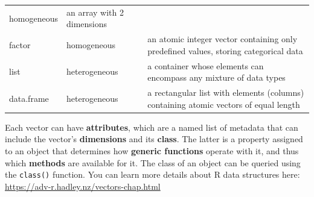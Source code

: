 \documentclass[
]{book}
\begin{document}
\begin{longtable}[]{@{}lll@{}}
\begin{minipage}[t]{0.10\columnwidth}
homogeneous\strut
\end{minipage} & \begin{minipage}[t]{0.71\columnwidth}\raggedright
an array with 2 dimensions\strut
\end{minipage}\tabularnewline
\begin{minipage}[t]{0.10\columnwidth}\raggedright
factor\strut
\end{minipage} & \begin{minipage}[t]{0.10\columnwidth}\raggedright
homogeneous\strut
\end{minipage} & \begin{minipage}[t]{0.71\columnwidth}\raggedright
an atomic integer vector containing only predefined values, storing categorical data\strut
\end{minipage}\tabularnewline
\begin{minipage}[t]{0.10\columnwidth}\raggedright
list\strut
\end{minipage} & \begin{minipage}[t]{0.10\columnwidth}\raggedright
heterogeneous\strut
\end{minipage} & \begin{minipage}[t]{0.71\columnwidth}\raggedright
a container whose elements can encompass any mixture of data types\strut
\end{minipage}\tabularnewline
\begin{minipage}[t]{0.10\columnwidth}\raggedright
data.frame\strut
\end{minipage} & \begin{minipage}[t]{0.10\columnwidth}\raggedright
heterogeneous\strut
\end{minipage} & \begin{minipage}[t]{0.71\columnwidth}\raggedright
a rectangular list with elements (columns) containing atomic vectors of equal length\strut
\end{minipage}\tabularnewline
\bottomrule
\end{longtable}

Each vector can have \textbf{attributes}, which are a named list of metadata that can include the vector's \textbf{dimensions} and its \textbf{class}. The latter is a property assigned to an object that determines how \textbf{generic functions} operate with it, and thus which \textbf{methods} are available for it. The class of an object can be queried using the \texttt{class()} function. You can learn more details about R data structures here: \url{https://adv-r.hadley.nz/vectors-chap.html}
\end{document}
